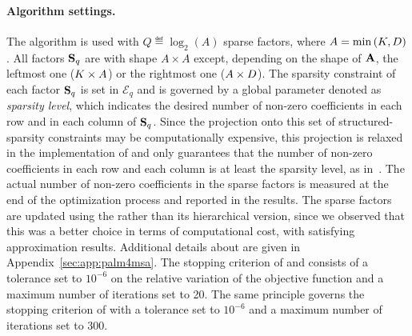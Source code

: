 \paragraph{Algorithm settings.} 
The \qkmeans algorithm is used with $Q\eqdef\log_2\left (A\right )$ sparse factors, where  $A=\min\left (K, D\right )$. 
All factors ${\mathbf{S}}_q$ are with shape $A \times A$ except, depending on the shape of ${\mathbf{A}}$, the leftmost one ($K\times A$) or the rightmost one ($A\times D$). 
The sparsity constraint of each factor ${\mathbf{S}}_q$ is set in $\mathcal{E}_q$ and is governed by a global parameter denoted as \textit{sparsity level}, which indicates the desired number of non-zero coefficients in each row and in each column of ${\mathbf{S}}_q$. 
Since the projection onto this set of structured-sparsity constraints may be computationally expensive, this projection is relaxed in the implementation of \palm and only guarantees that the number of non-zero coefficients in each row and each column is at least the sparsity level, as in~\cite{LeMagoarou2016Flexible}.
The actual number of non-zero coefficients in the sparse factors is measured at the end of the optimization process and reported in the results.
The sparse factors are updated using the \palm rather than its hierarchical version, since we observed that this was a better choice in terms of computational cost, with satisfying approximation results.
Additional details about \palm are given in Appendix~\ref{sec:app:palm4msa}.
The stopping criterion of \kmeans and \qkmeans consists of a tolerance set to $10^{-6}$ on the relative variation of the objective function and a maximum number of iterations set to 20. The same principle governs the stopping criterion of \palm with a tolerance set to $10^{-6}$ and a maximum number of iterations set to 300.

%



